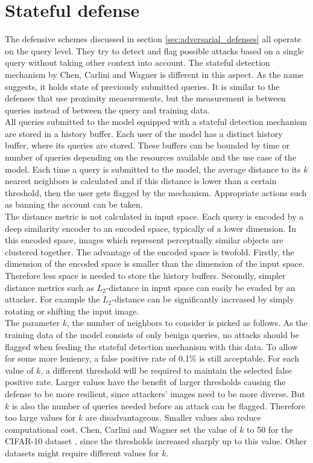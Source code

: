 \section{Stateful defense}\label{sec:stateful_detection}
The defensive schemes discussed in section \ref{sec:adversarial_defenses} all operate on the query level. They try to detect and flag possible attacks based on a single query without taking other context into account. The stateful detection mechanism by Chen, Carlini and Wagner \cite{chen_stateful_2019} is different in this aspect. As the name suggests, it holds state of previously submitted queries. It is similar to the defenses that use proximity measurements, but the measurement is between queries instead of between the query and training data.\\

All queries submitted to the model equipped with a stateful detection mechanism are stored in a history buffer. Each user of the model has a distinct history buffer, where its queries are stored. These buffers can be bounded by time or number of queries depending on the resources available and the use case of the model. Each time a query is submitted to the model, the average distance to its $k$ nearest neighbors is calculated and if this distance is lower than a certain threshold, then the user gets flagged by the mechanism. Appropriate actions such as banning the account can be taken.\\

The distance metric is not calculated in input space. Each query is encoded by a deep similarity encoder \cite{deep_similarity_encoder} to an encoded space, typically of a lower dimension. In this encoded space, images which represent perceptually similar objects are clustered together. The advantage of the encoded space is twofold. Firstly, the dimension of the encoded space is smaller than the dimension of the input space. Therefore less space is needed to store the history buffers. Secondly, simpler distance metrics such as $L_2$-distance in input space can easily be evaded by an attacker. For example the $L_2$-distance can be significantly increased by simply rotating or shifting the input image.\\

The parameter $k$, the number of neighbors to consider is picked as follows. As the training data of the model consists of only benign queries, no attacks should be flagged when feeding the stateful detection mechanism with this data. To allow for some more leniency, a false positive rate of 0.1\% is still acceptable. For each value of $k$, a different threshold will be required to maintain the selected false positive rate. Larger values have the benefit of larger thresholds causing the defense to be more resilient, since attackers' images need to be more diverse. But $k$ is also the number of queries needed before an attack can be flagged. Therefore too large values for $k$ are disadvantageous. Smaller values also reduce computational cost. Chen, Carlini and Wagner set the value of $k$ to 50 for the CIFAR-10  dataset \cite{cifar}, since the thresholds increased sharply up to this value. Other datasets might require different values for $k$.

